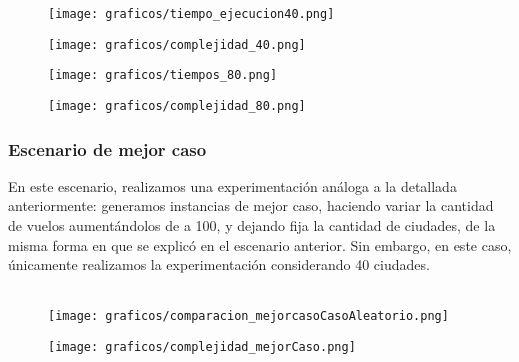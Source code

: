 	\begin{figure}[h]
		\begin{center}
		    \texttt{[image: graficos/tiempo\_ejecucion40.png]}
		\end{center}
	\end{figure}

\newpage


	\begin{figure}[h]
		\begin{center}
		   \texttt{[image: graficos/complejidad\_40.png]}
		\end{center}
	\end{figure}


	\begin{figure}[h]
		\begin{center}
		   \texttt{[image: graficos/tiempos\_80.png]}

		\end{center}
	\end{figure}

\newpage

	\begin{figure}[h]
		\begin{center}
		   \texttt{[image: graficos/complejidad\_80.png]}
		\end{center}
	\end{figure}

\subsubsection{Escenario de mejor caso}

\noindent En este escenario, realizamos una experimentación análoga a la detallada anteriormente: generamos instancias de mejor caso, haciendo variar la cantidad de vuelos aumentándolos de a 100, y dejando fija la cantidad de ciudades, de la misma forma en que se explicó en el escenario anterior. Sin embargo, en este caso, únicamente realizamos la experimentación considerando 40 ciudades. \\\\
	\begin{figure}[h]
		\begin{center}
		   \texttt{[image: graficos/comparacion\_mejorcasoCasoAleatorio.png]}
		\end{center}
	\end{figure}

\newpage
	\begin{figure}[h]
		\begin{center}
		   \texttt{[image: graficos/complejidad\_mejorCaso.png]}
		\end{center}
	\end{figure}


